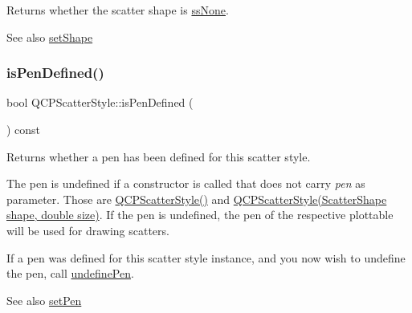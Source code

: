 Returns whether the scatter shape is \hyperlink{class_q_c_p_scatter_style_adb31525af6b680e6f1b7472e43859349abd144c291ca274f77053ec68cab6c022}{ss\+None}.

\begin{DoxySeeAlso}{See also}
\hyperlink{class_q_c_p_scatter_style_a7c641c4d4c6d29cb705d3887cfce91c1}{set\+Shape} 
\end{DoxySeeAlso}
\mbox{\label{class_q_c_p_scatter_style_a47077eb6450fe9a788f833e4ec1b1d5a}} 
\subsubsection{\texorpdfstring{is\+Pen\+Defined()}{isPenDefined()}}
{\footnotesize\ttfamily bool Q\+C\+P\+Scatter\+Style\+::is\+Pen\+Defined (\begin{DoxyParamCaption}{ }\end{DoxyParamCaption}) const\hspace{0.3cm}{\ttfamily [inline]}}

Returns whether a pen has been defined for this scatter style.

The pen is undefined if a constructor is called that does not carry {\itshape pen} as parameter. Those are \hyperlink{class_q_c_p_scatter_style_a8836018d9ad83ccd8870de8315c1be73}{Q\+C\+P\+Scatter\+Style()} and \hyperlink{class_q_c_p_scatter_style_a003d92f74f4561eda111862eadd62f28}{Q\+C\+P\+Scatter\+Style(\+Scatter\+Shape shape, double size)}. If the pen is undefined, the pen of the respective plottable will be used for drawing scatters.

If a pen was defined for this scatter style instance, and you now wish to undefine the pen, call \hyperlink{class_q_c_p_scatter_style_acabc2a8c83d650b946f50c3166b6c35e}{undefine\+Pen}.

\begin{DoxySeeAlso}{See also}
\hyperlink{class_q_c_p_scatter_style_a761f1f229cc0ca4703e1e2b89f6dd1ba}{set\+Pen} 
\end{DoxySeeAlso}
\mbox{\label{class_q_c_p_scatter_style_a74d692aaeb8d4b36d6f7d510e44264b1}} 
